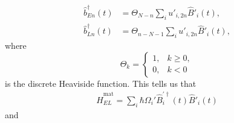 \documentclass{article}
\begin{document}
\begin{equation}
\begin{split}
\hat{b}_{En}^\dagger(t) &= \Theta_{N - n}\sum_iu'_{i,2n}\hat{B}'_i(t),\\
\hat{b}_{Ln}^\dagger(t) &= \Theta_{n - N - 1}\sum_iu'_{i,2n}\hat{B}'_i(t),
\end{split}
\end{equation}
where
\begin{equation}
\Theta_k = 
\begin{cases}
1, & k \geq 0,\\
0, & k < 0
\end{cases}
\end{equation}
is the discrete Heaviside function. This tells us that
\begin{equation}
\begin{split}
\hat{H}_{EL}^\mathrm{mat} = \sum_i\hbar\Omega_i'\hat{B}_i^{\prime\dagger}(t)\hat{B}'_i(t)
\end{split}
\end{equation}
and
\end{document}
